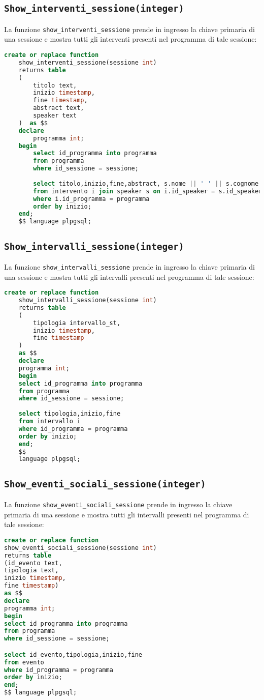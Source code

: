 \subsection{\texttt{Show\_interventi\_sessione(integer)}}
La funzione \texttt{show\_interventi\_sessione} prende in ingresso la chiave primaria di una sessione e mostra tutti gli interventi presenti nel programma di tale sessione:
\begin{lstlisting}[language=SQL,style=mystyle]
	create or replace function 
	show_interventi_sessione(sessione int)
	returns table
	(
		titolo text,
		inizio timestamp,
		fine timestamp,
		abstract text,
		speaker text
	)  as $$
	declare 
		programma int;
	begin
		select id_programma into programma
		from programma
		where id_sessione = sessione;
	
		select titolo,inizio,fine,abstract, s.nome || ' ' || s.cognome as speaker
		from intervento i join speaker s on i.id_speaker = s.id_speaker
		where i.id_programma = programma
		order by inizio;
	end;
	$$ language plpgsql;
\end{lstlisting}

\subsection{\texttt{Show\_intervalli\_sessione(integer)}}
La funzione \texttt{show\_intervalli\_sessione} prende in ingresso la chiave primaria di una sessione e mostra tutti gli intervalli presenti nel programma di tale sessione:
\begin{lstlisting}[language=SQL,style=mystyle]
	create or replace function 
	show_intervalli_sessione(sessione int)
	returns table
	(
		tipologia intervallo_st,
		inizio timestamp,
		fine timestamp
	)  
	as $$
	declare 
	programma int;
	begin
	select id_programma into programma
	from programma
	where id_sessione = sessione;
	
	select tipologia,inizio,fine
	from intervallo i
	where id_programma = programma
	order by inizio;
	end;
	$$ 
	language plpgsql;
\end{lstlisting}
\subsection{\texttt{Show\_eventi\_sociali\_sessione(integer)}}
La funzione \texttt{show\_eventi\_sociali\_sessione} prende in ingresso la chiave primaria di una sessione e mostra tutti gli intervalli presenti nel programma di tale sessione:
\begin{lstlisting}[language=SQL,style=mystyle]
create or replace function 
show_eventi_sociali_sessione(sessione int)
returns table
(id_evento text,
tipologia text,
inizio timestamp,
fine timestamp) 
as $$
declare 
programma int;
begin
select id_programma into programma
from programma
where id_sessione = sessione;

select id_evento,tipologia,inizio,fine
from evento
where id_programma = programma
order by inizio;
end;
$$ language plpgsql;
\end{lstlisting}
